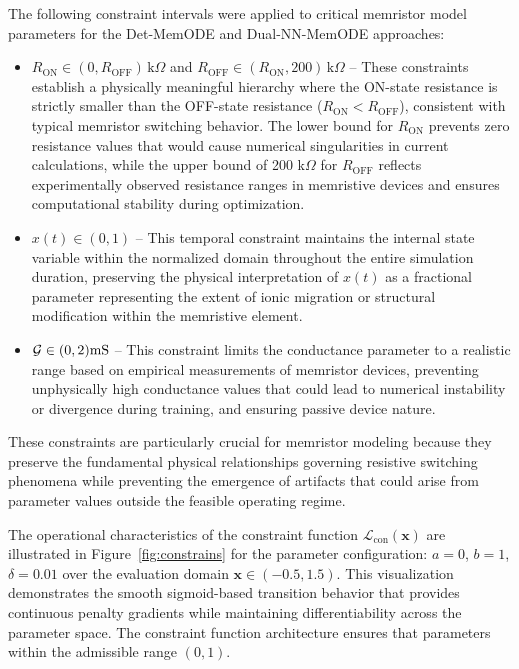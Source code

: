 \documentclass[lettersize,journal]{IEEEtran}
\newcommand{\G}{\mathcal{G}}
\begin{document}
The following constraint intervals were applied to critical memristor model parameters for the Det-MemODE and Dual-NN-MemODE approaches:
\begin{itemize}
  \item \(R_{\mathrm{ON}} \in (0, R_{\mathrm{OFF}})\,\mathrm{k}\Omega\) and \(R_{\mathrm{OFF}} \in (R_{\mathrm{ON}}, 200)\,\mathrm{k}\Omega\) – These constraints establish a physically meaningful hierarchy where the ON-state resistance is strictly smaller than the OFF-state resistance (\(R_{\mathrm{ON}} < R_{\mathrm{OFF}}\)), consistent with typical memristor switching behavior. The lower bound for \(R_{\mathrm{ON}}\) prevents zero resistance values that would cause numerical singularities in current calculations, while the upper bound of 200 k\(\Omega\) for \(R_{\mathrm{OFF}}\) reflects experimentally observed resistance ranges in memristive devices and ensures computational stability during optimization.
  \item \(x(t) \in (0, 1)\) – This temporal constraint maintains the internal state variable within the normalized domain throughout the entire simulation duration, preserving the physical interpretation of \(x(t)\) as a fractional parameter representing the extent of ionic migration or structural modification within the memristive element.
  \item \(\G \in (0, 2) \rm mS\) – This constraint limits the conductance parameter to a realistic range based on empirical measurements of memristor devices, preventing unphysically high conductance values that could lead to numerical instability or divergence during training, and ensuring passive device nature.
\end{itemize}


These constraints are particularly crucial for memristor modeling because they preserve the fundamental physical relationships governing resistive switching phenomena while preventing the emergence of artifacts that could arise from parameter values outside the feasible operating regime.


The operational characteristics of the constraint function \(\mathcal{L}_{\mathrm{con}}(\mathbf{x})\) are illustrated in Figure~\ref{fig:constrains} for the parameter configuration: \(a=0\), \(b=1\), \(\delta=0.01\) over the evaluation domain \(\mathbf{x} \in (-0.5, 1.5)\). This visualization demonstrates the smooth sigmoid-based transition behavior that provides continuous penalty gradients while maintaining differentiability across the parameter space. The constraint function architecture ensures that parameters within the admissible range \((0,1)\).
\end{document}

